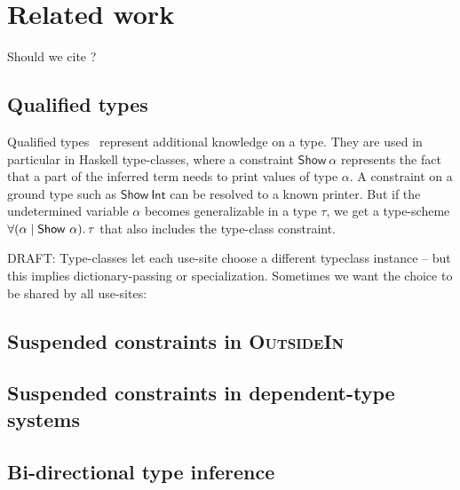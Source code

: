 \documentclass[acmsmall,screen,nonacm]{acmart}
\begin{document}

\section{Related work}
\label{sec:related-work}

Should we cite \cite{Leijen-Ye/prefix@pldi2025} ?

\subsection{Qualified types}



Qualified types~\citep*{TODO} represent additional knowledge on a type. They
are used in particular in Haskell type-classes, where a constraint
$\mathsf{Show}~\alpha$ represents the fact that a part of the inferred term
needs to print values of type $\alpha$. A constraint on a ground type such
as $\mathsf{Show}~\mathsf{Int}$ can be resolved to a known printer. But if
the undetermined variable $\alpha$ becomes generalizable in a type $\tau$,
we get a type-scheme $\forall {(\alpha \mid \mathsf{Show}~\alpha)}.\,{\tau}$ that
also includes the type-class constraint.

DRAFT: Type-classes let each use-site choose a different typeclass instance
-- but this implies dictionary-passing or specialization. Sometimes we want
the choice to be shared by all use-sites:


\subsection{Suspended constraints in \textsc{OutsideIn}}


\subsection{Suspended constraints in dependent-type systems}


\subsection{Bi-directional type inference}
\end{document}
